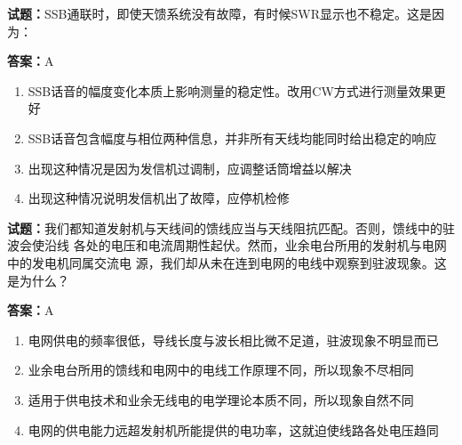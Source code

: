 \documentclass{ctexbook}
\begin{document}




\vspace{1em}

\textbf{试题：}SSB通联时，即使天馈系统没有故障，有时候SWR显示也不稳定。这是因为： 

\textbf{答案：}A 

\begin{enumerate}[leftmargin=3em]
  \item SSB话音的幅度变化本质上影响测量的稳定性。改用CW方式进行测量效果更好 

  \item SSB话音包含幅度与相位两种信息，并非所有天线均能同时给出稳定的响应 

  \item 出现这种情况是因为发信机过调制，应调整话筒增益以解决 

  \item 出现这种情况说明发信机出了故障，应停机检修 

\end{enumerate}






\vspace{1em}

\textbf{试题：}我们都知道发射机与天线间的馈线应当与天线阻抗匹配。否则，馈线中的驻波会使沿线
各处的电压和电流周期性起伏。然而，业余电台所用的发射机与电网中的发电机同属交流电
源，我们却从未在连到电网的电线中观察到驻波现象。这是为什么？ 

\textbf{答案：}A 

\begin{enumerate}[leftmargin=3em]
  \item 电网供电的频率很低，导线长度与波长相比微不足道，驻波现象不明显而已 

  \item 业余电台所用的馈线和电网中的电线工作原理不同，所以现象不尽相同 

  \item 适用于供电技术和业余无线电的电学理论本质不同，所以现象自然不同 

  \item 电网的供电能力远超发射机所能提供的电功率，这就迫使线路各处电压趋同 

\end{enumerate}

\end{document}
